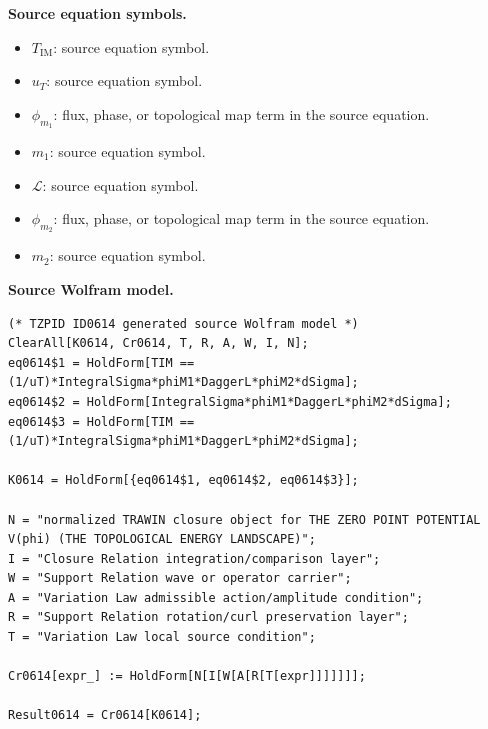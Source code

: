 \begin{minipage}[t]{0.49\linewidth}
\begingroup
\small
\raggedright
\textbf{Source equation symbols.}\par
\begin{itemize}[leftmargin=1.35em,itemsep=1pt,topsep=1pt,parsep=0pt]
    \item $T_{\mathrm{IM}}$: source equation symbol.
    \item $u_T$: source equation symbol.
    \item $\phi_{m_1}$: flux, phase, or topological map term in the source equation.
    \item $m_1$: source equation symbol.
    \item $\mathcal{L}$: source equation symbol.
    \item $\phi_{m_2}$: flux, phase, or topological map term in the source equation.
    \item $m_2$: source equation symbol.
\end{itemize}
\endgroup
\end{minipage}\hfill
\begin{minipage}[t]{0.47\linewidth}
\begingroup
\scriptsize
\raggedright
\textbf{Source Wolfram model.}\par
\begin{Verbatim}[fontsize=\tiny,breaklines=true,breakanywhere=true]
(* TZPID ID0614 generated source Wolfram model *)
ClearAll[K0614, Cr0614, T, R, A, W, I, N];
eq0614$1 = HoldForm[TIM == (1/uT)*IntegralSigma*phiM1*DaggerL*phiM2*dSigma];
eq0614$2 = HoldForm[IntegralSigma*phiM1*DaggerL*phiM2*dSigma];
eq0614$3 = HoldForm[TIM == (1/uT)*IntegralSigma*phiM1*DaggerL*phiM2*dSigma];

K0614 = HoldForm[{eq0614$1, eq0614$2, eq0614$3}];

N = "normalized TRAWIN closure object for THE ZERO POINT POTENTIAL V(phi) (THE TOPOLOGICAL ENERGY LANDSCAPE)";
I = "Closure Relation integration/comparison layer";
W = "Support Relation wave or operator carrier";
A = "Variation Law admissible action/amplitude condition";
R = "Support Relation rotation/curl preservation layer";
T = "Variation Law local source condition";

Cr0614[expr_] := HoldForm[N[I[W[A[R[T[expr]]]]]]];

Result0614 = Cr0614[K0614];
\end{Verbatim}
\endgroup
\end{minipage}

